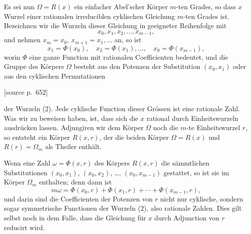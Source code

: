 \documentclass[11pt]{article}
\newcommand{\Om}{\Omega}
\newcommand{\srcpage}[1]{\par\medskip\noindent\textsf{[source p.~#1]}\par\smallskip}
\begin{document}
Es sei nun $\Om=R(x)$ ein einfacher Abel'scher Körper $m$-ten Grades, so dass $x$ Wurzel einer rationalen irreduciblen cyklischen Gleichung $m$-ten Grades ist. Bezeichnen wir die Wurzeln dieser Gleichung in geeigneter Reihenfolge mit
\begin{equation}
  x_0,x_1,x_2,\ldots,x_{m-1},
\tag{2}
\end{equation}
und nehmen $x_m=x_0$, $x_{m+1}=x_1,\ldots$ an, so ist
\[
  x_1=\Phi(x_0),\quad x_2=\Phi(x_1),\ldots,\quad x_0=\Phi(x_{m-1}),
\]
worin $\Phi$ eine ganze Function mit rationalen Coefficienten bedeutet, und die Gruppe des Körpers $\Om$ besteht aus den Potenzen der Substitution $(x_0,x_1)$ oder aus den cyklischen Permutationen

\srcpage{652}
der Wurzeln (2). Jede cyklische Function dieser Grössen ist eine rationale Zahl. Was wir zu beweisen haben, ist, dass sich die $x$ rational durch Einheitswurzeln ausdrücken lassen. Adjungiren wir dem Körper $\Om$ noch die $m$-te Einheitswurzel $r$, so entsteht ein Körper $R(x,r)$, der die beiden Körper $\Om=R(x)$ und $R(r)=\Omega_m$ als Theiler enthält.

Wenn eine Zahl $\omega=\Phi(x,r)$ des Körpers $R(x,r)$ die sämmtlichen Substitutionen $(x_0,x_1)$, $(x_0,x_2)$, \ldots, $(x_0,x_{m-1})$ gestattet, so ist sie im Körper $\Omega_m$ enthalten; denn dann ist
\[
  m\omega=\Phi(x_0,r)+\Phi(x_1,r)+\cdots+\Phi(x_{m-1},r),
\]
und darin sind die Coefficienten der Potenzen von $r$ nicht nur cyklische, sondern sogar symmetrische Functionen der Wurzeln (2), also rationale Zahlen. Dies gilt selbst noch in dem Falle, dass die Gleichung für $x$ durch Adjunction von $r$ reducirt wird.
\end{document}
